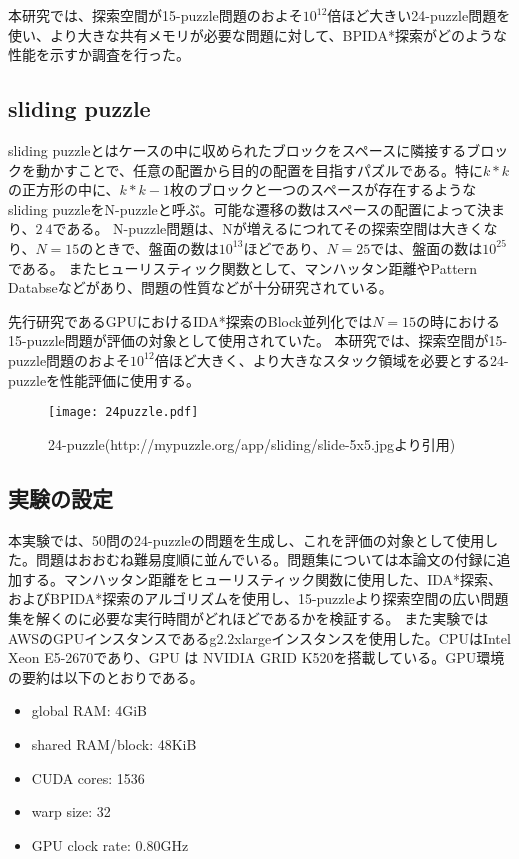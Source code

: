 \documentclass[a4paper,11pt,oneside,openany]{jsbook}
\begin{document}
本研究では、探索空間が15-puzzle問題のおよそ$10^12$倍ほど大きい24-puzzle問題を使い、より大きな共有メモリが必要な問題に対して、BPIDA*探索がどのような性能を示すか調査を行った。


\subsection{sliding puzzle}
sliding puzzleとはケースの中に収められたブロックをスペースに隣接するブロックを動かすことで、任意の配置から目的の配置を目指すパズルである。特に$k * k$の正方形の中に、$ k * k - 1$枚のブロックと一つのスペースが存在するようなsliding puzzleをN-puzzleと呼ぶ。可能な遷移の数はスペースの配置によって決まり、$2~4$である。
N-puzzle問題は、Nが増えるにつれてその探索空間は大きくなり、$N=15$のときで、盤面の数は$10^13$ほどであり、$N=25$では、盤面の数は$10^25$である。
またヒューリスティック関数として、マンハッタン距離やPattern Databseなどがあり、問題の性質などが十分研究されている。

先行研究であるGPUにおけるIDA*探索のBlock並列化\cite{HA17}では$N=15$の時における15-puzzle問題が評価の対象として使用されていた。
本研究では、探索空間が15-puzzle問題のおよそ$10^12$倍ほど大きく、より大きなスタック領域を必要とする24-puzzleを性能評価に使用する。
\begin{figure}[htbp]
\begin{center}
\texttt{[image: 24puzzle.pdf]}
\caption{24-puzzle(http://mypuzzle.org/app/sliding/slide-5x5.jpgより引用)}
\end{center}
\end{figure}


\subsection{実験の設定}
本実験では、50問の24-puzzleの問題を生成し、これを評価の対象として使用した。問題はおおむね難易度順に並んでいる。問題集については本論文の付録に追加する。マンハッタン距離をヒューリスティック関数に使用した、IDA*探索、およびBPIDA*探索\cite{HA17}のアルゴリズムを使用し、15-puzzleより探索空間の広い問題集を解くのに必要な実行時間がどれほどであるかを検証する。
また実験ではAWSのGPUインスタンスであるg2.2xlargeインスタンスを使用した。CPUはIntel Xeon E5-2670であり、GPU
は NVIDIA GRID K520を搭載している。GPU環境の要約は以下のとおりである。
\begin{itemize}
 \item global RAM: 4GiB
 \item shared RAM/block: 48KiB
 \item CUDA cores: 1536
 \item warp size: 32
 \item GPU clock rate: 0.80GHz
\end{itemize}
\end{document}
